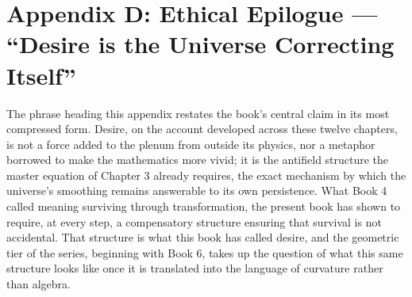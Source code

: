 \chapter*{Appendix D: Ethical Epilogue --- ``Desire is the Universe Correcting Itself''}

The phrase heading this appendix restates the book's central claim in its most compressed form. Desire, on the account developed across these twelve chapters, is not a force added to the plenum from outside its physics, nor a metaphor borrowed to make the mathematics more vivid; it is the antifield structure the master equation of Chapter 3 already requires, the exact mechanism by which the universe's smoothing remains answerable to its own persistence. What Book 4 called meaning surviving through transformation, the present book has shown to require, at every step, a compensatory structure ensuring that survival is not accidental. That structure is what this book has called desire, and the geometric tier of the series, beginning with Book 6, takes up the question of what this same structure looks like once it is translated into the language of curvature rather than algebra.
